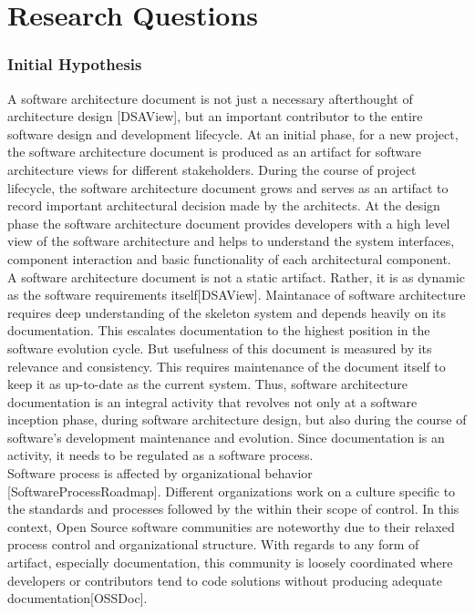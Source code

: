 \chapter{Research Questions}\label{chapter:ResearchQuestions}

\subsection{Initial Hypothesis}

\indent A software architecture document is not just a necessary afterthought of architecture design [DSAView], but an important contributor to the entire software design and development lifecycle.  At an initial phase, for a new project, the software architecture document is produced as an artifact for software architecture views for different stakeholders. During the course of project lifecycle, the software architecture document grows and serves as an artifact to record important architectural decision made by the architects. At the design phase the software architecture document provides developers with a high level view of the software architecture and helps to understand the system interfaces, component interaction and basic functionality of each architectural component. 
\\\indent A software architecture document is not a static artifact. Rather, it is as dynamic as the software requirements itself[DSAView]. Maintanace of software architecture requires deep understanding of the skeleton system and depends heavily on its documentation. This escalates documentation to the highest position in the software evolution cycle. But usefulness of this document is measured by its relevance and consistency. This requires maintenance of the document itself to keep it as up-to-date as the current system. Thus, software architecture documentation is an integral activity that revolves not only at a software inception phase, during software architecture design, but also during the course of software’s development maintenance and evolution. Since documentation is an activity, it needs to be regulated as a software process. 
\\\indent Software process is affected by organizational behavior [SoftwareProcessRoadmap]. Different organizations work on a culture specific to the standards and processes followed by the within their scope of control. In this context, Open Source software communities are noteworthy due to their relaxed process control and organizational structure. With regards to any form of artifact, especially documentation, this community is loosely coordinated where developers or contributors tend to code solutions without producing adequate documentation[OSSDoc].

